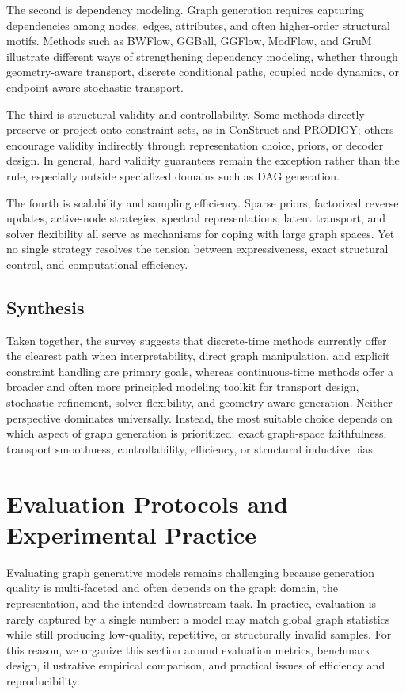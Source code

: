 \documentclass{article}
\begin{document}
The second is dependency modeling. Graph generation requires capturing dependencies among nodes, edges, attributes, and often higher-order structural motifs. Methods such as BWFlow, GGBall, GGFlow, ModFlow, and GruM illustrate different ways of strengthening dependency modeling, whether through geometry-aware transport, discrete conditional paths, coupled node dynamics, or endpoint-aware stochastic transport.

The third is structural validity and controllability. Some methods directly preserve or project onto constraint sets, as in ConStruct and PRODIGY; others encourage validity indirectly through representation choice, priors, or decoder design. In general, hard validity guarantees remain the exception rather than the rule, especially outside specialized domains such as DAG generation.

The fourth is scalability and sampling efficiency. Sparse priors, factorized reverse updates, active-node strategies, spectral representations, latent transport, and solver flexibility all serve as mechanisms for coping with large graph spaces. Yet no single strategy resolves the tension between expressiveness, exact structural control, and computational efficiency.

\subsection{Synthesis}

Taken together, the survey suggests that discrete-time methods currently offer the clearest path when interpretability, direct graph manipulation, and explicit constraint handling are primary goals, whereas continuous-time methods offer a broader and often more principled modeling toolkit for transport design, stochastic refinement, solver flexibility, and geometry-aware generation. Neither perspective dominates universally. Instead, the most suitable choice depends on which aspect of graph generation is prioritized: exact graph-space faithfulness, transport smoothness, controllability, efficiency, or structural inductive bias.

\section{Evaluation Protocols and Experimental Practice}
\label{sec:evaluation_protocols}

Evaluating graph generative models remains challenging because generation quality is multi-faceted and often depends on the graph domain, the representation, and the intended downstream task. In practice, evaluation is rarely captured by a single number: a model may match global graph statistics while still producing low-quality, repetitive, or structurally invalid samples. For this reason, we organize this section around evaluation metrics, benchmark design, illustrative empirical comparison, and practical issues of efficiency and reproducibility.
\end{document}
